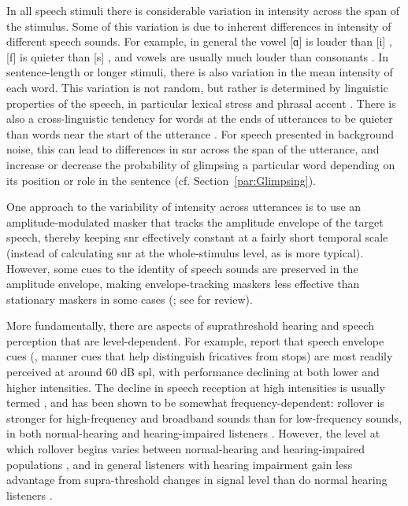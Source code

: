 In all speech stimuli there is considerable variation in intensity across the span of the stimulus.  Some of this variation is due to inherent differences in intensity of different speech sounds.  For example, in general the vowel [ɑ] is louder than [i] \citep{Ladefoged1967}, [f] is quieter than [s] \citep{sowl}, and vowels are usually much louder than consonants \citep{HoriiEtAl1971}.  In sentence-length or longer stimuli, there is also variation in the mean intensity of each word.  This variation is not random, but rather is determined by linguistic properties of the speech, in particular lexical stress and phrasal accent \citep{Fry1955, SluijterVanHeuven1996, PlagEtAl2011}.  There is also a cross-linguistic tendency for words at the ends of utterances to be quieter than words near the start of the utterance \citep{StrikBoves1995, TrouvainEtAl1998}.  For speech presented in background noise, this can lead to differences in \ac{snr} across the span of the utterance, and increase or decrease the probability of glimpsing a particular word depending on its position or role in the sentence (cf. Section~\ref{par:Glimpsing}).  

One approach to the variability of intensity across utterances is to use an amplitude-modulated masker that tracks the amplitude envelope of the target speech, thereby keeping \ac{snr} effectively constant at a fairly short temporal scale (instead of calculating \ac{snr} at the whole-stimulus level, as is more typical).  However, some cues to the identity of speech sounds are preserved in the amplitude envelope, making envelope-tracking maskers less effective than stationary maskers in some cases (\citealp{HoriiEtAl1971, VanTasellEtAl1987, BashfordEtAl1996}; see \citealp{Wright2004b} for review).

More fundamentally, there are aspects of suprathreshold hearing and speech perception that are level-dependent.  For example, \citet{DubnoEtAl2012} report that speech envelope cues (\eg, manner cues that help distinguish fricatives from stops) are most readily perceived at around 60 {dB} \ac{spl}, with performance declining at both lower and higher intensities.  The decline in speech reception at high intensities is usually termed , and has been shown to be somewhat frequency-dependent: rollover is stronger for high-frequency and broadband sounds than for low-frequency sounds, in both normal-hearing and hearing-impaired listeners \citep{SummersCord2007}.  However, the level at which rollover begins varies between normal-hearing and hearing-impaired populations \citep{SummersCord2007}, and in general listeners with hearing impairment gain less advantage from supra-threshold changes in signal level than do normal hearing listeners \citep{SummersMolis2004}.

